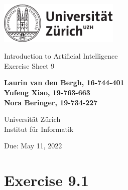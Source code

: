 \documentclass[12pt]{article}
\begin{document}
\begin{titlepage}
\includegraphics[height=20mm]{../images/uzh_logo}\\

\begin{flushleft}

\vspace{2cm}

{\Large Introduction to Artificial Intelligence\\Exercise Sheet 9}\\

\vspace{4cm}

\textbf{Laurin van den Bergh, 16-744-401\\Yufeng Xiao, 19-763-663\\Nora Beringer, 19-734-227}\\

\vspace{2cm}

Universität Zürich\\
Institut für Informatik

\vfill Due: May 11, 2022

\vspace{3cm}


\end{flushleft}
\end{titlepage}

\newpage

\section*{Exercise 9.1}
\end{document}
